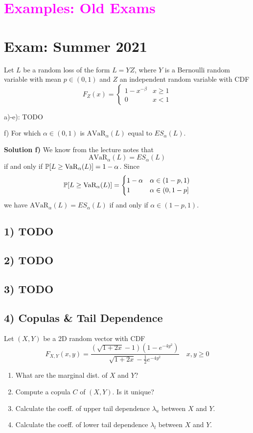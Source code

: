 \section*{\textcolor{magenta}{Examples: Old Exams}}

%
%
\section*{Exam: Summer 2021}
Let $L$ be a random loss of the form $L=YZ$, where $Y$ is a Bernoulli random variable with mean $p\in(0,1)$ and $Z$ an independent random variable with CDF
\[
    F_Z(x) =
    \begin{cases}
        1 - x^{-\beta} &x \geq 1\\
        0 & x < 1
    \end{cases}
\]

a)-e): TODO

f) For which $\alpha \in(0,1)$ is $\text{AVaR}_\alpha(L)$ equal to $ES_\alpha(L)$.

\textbf{Solution f)} We know from the lecture notes that $$\text{AVaR}_\alpha(L) = ES_\alpha(L)$$ if and only if $\mathbb{P}[L \geq \text{VaR}_\alpha(L)] = 1 - \alpha$.
Since
\[
    \mathbb{P}[L \geq \text{VaR}_\alpha(L)] =
    \begin{cases}
        1 - \alpha & \alpha \in (1-p, 1) \\
        1 & \alpha \in (0, 1-p]
    \end{cases}
\]
we have $\text{AVaR}_\alpha(L) = ES_\alpha(L)$ if and only if $\alpha \in (1-p, 1)$.

%
%
\subsection*{1) TODO}

%
%
\subsection*{2) TODO}

%
%
\subsection*{3) TODO}

%
%
\subsection*{4) Copulas \& Tail Dependence}
Let $(X,Y)$ be a 2D random vector with CDF
\[
    F_{X,Y}(x,y) = \frac{(\sqrt{1 + 2x} - 1)(1 - e^{-4y^2})}
    {\sqrt{1+2x} - \frac{1}{2}e^{-4y^2}} \quad x,y\geq 0
\]
\begin{enumerate}[label=(\alph*)]
    \item What are the marginal dist. of $X$ and $Y$?
    \item Compute a copula $C$ of $(X,Y)$. Is it unique?
    \item Calculate the coeff. of upper tail dependence $\lambda_u$ between $X$ and $Y$.
    \item Calculate the coeff. of lower tail dependence $\lambda_l$ between $X$ and $Y$.
\end{enumerate}

